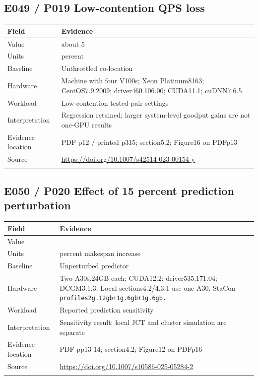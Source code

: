 \subsection*{E049 / P019 Low-contention QPS loss}

\begin{longtable}{>{\raggedright\arraybackslash}p{}>{\raggedright\arraybackslash}p{}}
\toprule
\textbf{Field} & \textbf{Evidence}\\\midrule\endhead
Value & about 5\\\addlinespace
Units & percent\\\addlinespace
Baseline & Unthrottled co-location\\\addlinespace
Hardware & Machine with four V100s; Xeon Platinum8163; CentOS7.9.2009; driver460.106.00; CUDA11.1; cuDNN7.6.5.\\\addlinespace
Workload & Low-contention tested pair settings\\\addlinespace
Interpretation & Regression retained; larger system-level goodput gains are not one-GPU results\\\addlinespace
Evidence location & PDF p12 / printed p315; section5.2; Figure16 on PDFp13\\\addlinespace
Source & \url{https://doi.org/10.1007/s42514-023-00154-y}\\\addlinespace
\bottomrule\end{longtable}

\subsection*{E050 / P020 Effect of 15 percent prediction perturbation}

\begin{longtable}{>{\raggedright\arraybackslash}p{}>{\raggedright\arraybackslash}p{}}
\toprule
\textbf{Field} & \textbf{Evidence}\\\midrule\endhead
Value & 8.09\\\addlinespace
Units & percent makespan increase\\\addlinespace
Baseline & Unperturbed predictor\\\addlinespace
Hardware & Two A30s,24GB each; CUDA12.2; driver535.171.04; DCGM3.1.3. Local sections4.2/4.3.1 use one A30. StaCon \nolinkurl{profiles2g.12gb+1g.6gb+1g.6gb.}\\\addlinespace
Workload & Reported prediction sensitivity\\\addlinespace
Interpretation & Sensitivity result; local JCT and cluster simulation are separate\\\addlinespace
Evidence location & PDF pp13-14; section4.2; Figure12 on PDFp16\\\addlinespace
Source & \url{https://doi.org/10.1007/s10586-025-05284-2}\\\addlinespace
\bottomrule\end{longtable}


